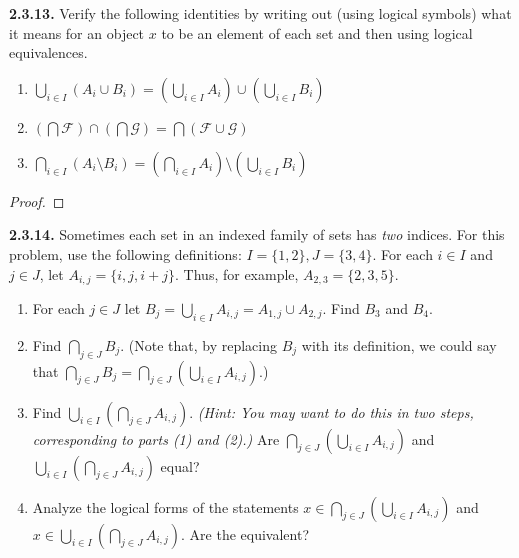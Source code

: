 \documentclass[12pt]{amsart}
\newenvironment{statement}[1]{\smallskip\noindent\color[rgb]{.6627, .3529, .6314} {\bf #1.}}{}
\theoremstyle{definition}
\theoremstyle{remark}
\begin{document}
\begin{statement}{2.3.13}
Verify the following identities by writing out (using logical symbols) what it means for an object $x$
to be an element of each set and then using logical equivalences.
\begin{enumerate}
	\item $\bigcup_{i \in I} (A_i \cup B_i)
	= \left( \bigcup_{i \in I} A_i \right) \cup \left( \bigcup_{i \in I} B_i \right)$
	
	\item $\left( \bigcap \mathcal{F} \right) \cap \left( \bigcap \mathcal{G} \right)
	= \bigcap (\mathcal{F} \cup \mathcal{G})$
	
	\item $\bigcap_{i \in I} (A_i \setminus B_i)
	= \left( \bigcap_{i \in I} A_i \right) \setminus \left( \bigcup_{i \in I} B_i \right)$
\end{enumerate}
\end{statement}

\begin{proof}
\end{proof}


\begin{statement}{2.3.14}
Sometimes each set in an indexed family of sets has \emph{two} indices.
For this problem, use the following definitions:
$I = \{ 1, 2 \}, J = \{ 3, 4 \}$.
For each $i \in I$ and $j \in J$, let $A_{i, j} = \{ i, j, i + j \}$.
Thus, for example, $A_{2, 3} = \{ 2, 3, 5 \}$.
\begin{enumerate}
	\item For each $j \in J$ let $B_j = \bigcup_{i \in I} A_{i, j} = A_{1, j} \cup A_{2, j}$.
	Find $B_3$ and $B_4$.
	
	\item Find $\bigcap_{j \in J} B_j$.
	(Note that, by replacing $B_j$ with its definition, we could say that
	$\bigcap_{j \in J} B_j = \bigcap_{j \in J} \left( \bigcup_{i \in I} A_{i, j} \right)$.)
	
	\item Find $\bigcup_{i \in I} \left( \bigcap_{j \in J} A_{i, j} \right)$.
	\emph{(Hint: You may want to do this in two steps, corresponding to parts (1) and (2).)}
	Are $\bigcap_{j \in J} \left( \bigcup_{i \in I} A_{i, j} \right)$
	and $\bigcup_{i \in I} \left( \bigcap_{j \in J} A_{i, j} \right)$ equal?
	
	\item Analyze the logical forms of the statements
	$x \in \bigcap_{j \in J} \left( \bigcup_{i \in I} A_{i, j} \right)$
	and $x \in \bigcup_{i \in I} \left( \bigcap_{j \in J} A_{i, j} \right)$.
	Are the equivalent?
\end{enumerate}
\end{statement}
\end{document}

